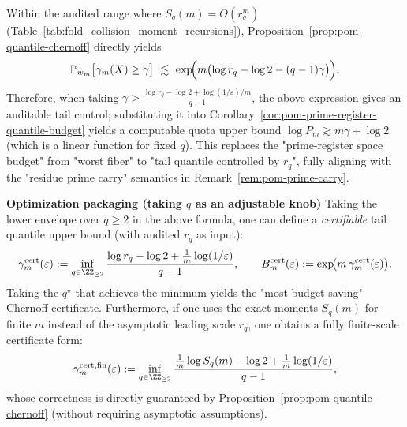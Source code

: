 
\begin{remark}\label{rem:pom-quantile-budget-computable}
Within the audited range where $S_q(m)=\Theta(r_q^m)$ (Table~\ref{tab:fold_collision_moment_recursions}), Proposition~\ref{prop:pom-quantile-chernoff} directly yields
$$
\mathbb{P}_{w_m}\big[\gamma_m(X)\ge\gamma\big]\ \lesssim\
\exp\!\Bigl(m\bigl(\log r_q-\log 2-(q-1)\gamma\bigr)\Bigr).
$$
Therefore, when taking
\(
\gamma>\frac{\log r_q-\log 2+\log(1/\varepsilon)/m}{q-1}
\),
the above expression gives an auditable tail control; substituting it into Corollary~\ref{cor:pom-prime-register-quantile-budget} yields a computable quota upper bound
\(
\log P_m
\gtrsim
m\gamma+\log 2
\)
(which is a linear function for fixed $q$).
This replaces the "prime-register space budget" from "worst fiber" to "tail quantile controlled by $r_q$", fully aligning with the "residue prime carry" semantics in Remark~\ref{rem:pom-prime-carry}.

\medskip\noindent\textbf{Optimization packaging (taking $q$ as an adjustable knob)}
Taking the lower envelope over $q\ge 2$ in the above formula, one can define a \emph{certifiable} tail quantile upper bound (with audited $r_q$ as input):
\[
\gamma^{\mathrm{cert}}_m(\varepsilon)
:=\inf_{q\in\ZZ_{\ge 2}}
\frac{\log r_q-\log 2+\frac{1}{m}\log(1/\varepsilon)}{q-1},
\qquad
B^{\mathrm{cert}}_m(\varepsilon):=\exp\!\bigl(m\,\gamma^{\mathrm{cert}}_m(\varepsilon)\bigr).
\]
Taking the $q^\star$ that achieves the minimum yields the "most budget-saving" Chernoff certificate.
Furthermore, if one uses the exact moments $S_q(m)$ for finite $m$ instead of the asymptotic leading scale $r_q$, one obtains a fully finite-scale certificate form:
\[
\gamma^{\mathrm{cert,fin}}_m(\varepsilon)
:=\inf_{q\in\ZZ_{\ge 2}}
\frac{\frac{1}{m}\log S_q(m)-\log 2+\frac{1}{m}\log(1/\varepsilon)}{q-1},
\]
whose correctness is directly guaranteed by Proposition~\ref{prop:pom-quantile-chernoff} (without requiring asymptotic assumptions).


\end{remark}

